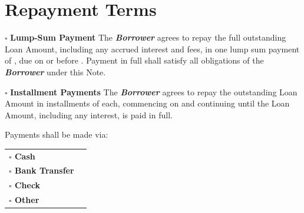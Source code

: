 
\section{Repayment Terms}
\label{sec:repayment}

$\square$ \textbf{Lump-Sum Payment}
The \textbf{\textit{Borrower}} agrees to repay the full outstanding Loan Amount, including any accrued interest and fees, in one lump sum payment of \LendedAmountNumber{} \LendedAmountCurrencySymbol{}, due on or before \LoanLumpSumDue{}. Payment in full shall satisfy all obligations of the \textbf{\textit{Borrower}} under this Note.

\vspace{0.3cm}

\noindent $\square$ \textbf{Installment Payments}
The \textbf{\textit{Borrower}} agrees to repay the outstanding Loan Amount in \LoanInstallmentPeriod{} installments of \LoanInstallmentAmount{}  each, commencing on \LoanInstallmentStart{}  and continuing until the Loan Amount, including any interest, is paid in full.

\vspace{0.3cm}

\noindent Payments shall be made via:

\vspace{0.3cm}

\noindent
\begin{tabular}{p{6cm} p{10cm}}
\textbf{$\square$ Cash} & \LoanRepaymentCashMethod{} \\ 
\textbf{$\square$ Bank Transfer} & \LoanRepaymentBankMethod{} \\ 
\textbf{$\square$ Check} & \LoanRepaymentCheckMethod{} \\ 
\textbf{$\square$ Other} & \LoanRepaymentOtherMethod{} \\ 
\end{tabular}


